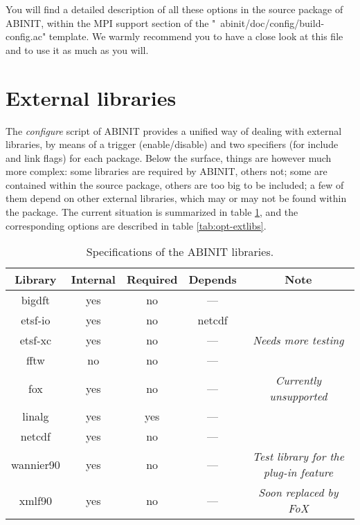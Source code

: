 You will find a detailed description of all these options in the source
package of ABINIT, within the MPI support section of the
"{~}abinit/doc/config/build-config.ac" template. We warmly recommend you
to have a close look at this file and to use it as much as you will.

\section{External libraries}

The \textit{configure} script of ABINIT provides a unified way of
dealing with external libraries, by means of a trigger (enable/disable)
and two specifiers (for include and link flags) for each package. 
Below the surface, things are however much more complex: some libraries
are required by ABINIT, others not; some are contained within the source
package, others are too big to be included; a few of them depend on
other external libraries, which may or may not be found within the
package. The current situation is summarized in table
\ref{tab:dsc-extlibs}, and the corresponding options are described in
table \ref{tab:opt-extlibs}.
\\

\begin{table}
\begin{center}
\begin{tabular}{|c|c|c|c|c|}
\hline
\textbf{Library} & \textbf{Internal} & \textbf{Required} &
\textbf{Depends} & \textbf{Note} \\
\hline
bigdft    & yes & no  & ---    & \\
\hline
etsf-io   & yes & no  & netcdf & \\
\hline
etsf-xc   & yes & no  & ---    & \textit{Needs more testing} \\
\hline
fftw      & no  & no  & ---    & \\
\hline
fox       & yes & no  & ---    & \textit{Currently unsupported} \\
\hline
linalg    & yes & yes & ---    & \\
\hline
netcdf    & yes & no  & ---    & \\
\hline
wannier90 & yes & no  & ---    & \textit{Test library for the plug-in
                                 feature} \\
\hline
xmlf90    & yes & no  & ---    & \textit{Soon replaced by FoX} \\
\hline
\end{tabular}
\end{center}
\caption{Specifications of the ABINIT libraries.}
\label{tab:dsc-extlibs}
\end{table}

